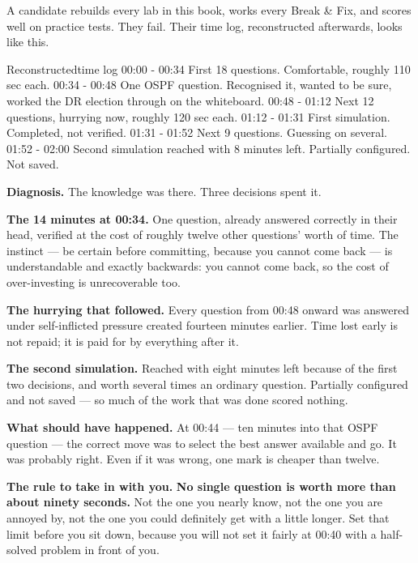 \begin{breakfix}
A candidate rebuilds every lab in this book, works every Break \& Fix, and scores
well on practice tests. They fail. Their time log, reconstructed afterwards,
looks like this.

\begin{verify}{Reconstructed}{time log}
00:00 - 00:34   First 18 questions. Comfortable, roughly 110 sec each.
00:34 - 00:48   One OSPF question. Recognised it, wanted to be sure,
                worked the DR election through on the whiteboard.
00:48 - 01:12   Next 12 questions, hurrying now, roughly 120 sec each.
01:12 - 01:31   First simulation. Completed, not verified.
01:31 - 01:52   Next 9 questions. Guessing on several.
01:52 - 02:00   Second simulation reached with 8 minutes left.
                Partially configured. Not saved.
\end{verify}

\textbf{Diagnosis.} The knowledge was there. Three decisions spent it.

\textbf{The 14 minutes at 00:34.} One question, already answered correctly in
their head, verified at the cost of roughly twelve other questions' worth of
time. The instinct --- be certain before committing, because you cannot come back
--- is understandable and exactly backwards: you cannot come back, so the cost of
over-investing is unrecoverable too.

\textbf{The hurrying that followed.} Every question from 00:48 onward was
answered under self-inflicted pressure created fourteen minutes earlier. Time
lost early is not repaid; it is paid for by everything after it.

\textbf{The second simulation.} Reached with eight minutes left because of the
first two decisions, and worth several times an ordinary question. Partially
configured and not saved --- so much of the work that was done scored nothing.

\textbf{What should have happened.} At 00:44 --- ten minutes into that OSPF
question --- the correct move was to select the best answer available and go. It
was probably right. Even if it was wrong, one mark is cheaper than twelve.

\textbf{The rule to take in with you.} \textbf{No single question is worth more
than about ninety seconds.} Not the one you nearly know, not the one you are
annoyed by, not the one you could definitely get with a little longer. Set that
limit before you sit down, because you will not set it fairly at 00:40 with a
half-solved problem in front of you.
\end{breakfix}

